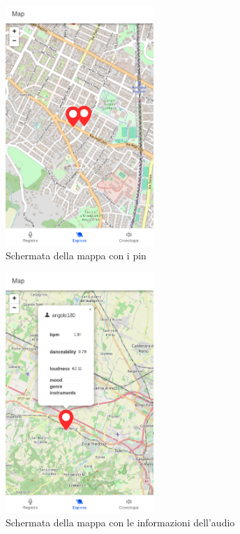 \documentclass[a4paper]{article}
\begin{document}
\begin{figure}[h]
	\centering
	\includegraphics[width=0.5\textwidth]{./map-pins.png}
	\caption{Schermata della mappa con i pin}
	
\end{figure}

\begin{figure}[h]
	\centering
	\includegraphics[width=0.5\textwidth]{./map-audio-info.png}
	\caption{Schermata della mappa con le informazioni dell'audio}
\end{figure}
\end{document}
